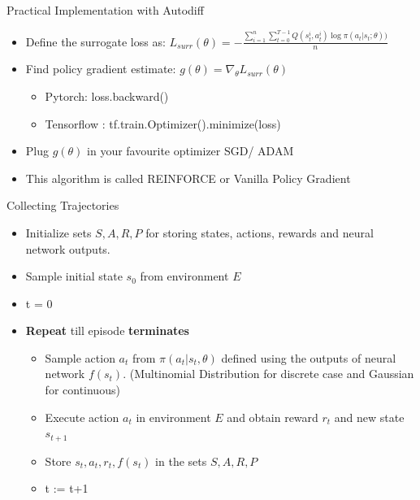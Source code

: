 \begin{frame}{Practical Implementation with Autodiff}
    \begin{itemize}
    \item Define the surrogate loss as:
    $L_{surr}(\theta) = -\frac{\sum_{i = 1}^n \sum_{t=0}^{T-1}Q(s_t^i,a_t^i)\log\pi(a_t|s_t;\theta))}{n}$
    \item Find policy gradient estimate: $g(\theta) = \nabla_{\theta}L_{surr}(\theta)$
    \begin{itemize}
        \item Pytorch: loss.backward()
        \item Tensorflow : tf.train.Optimizer().minimize(loss)
    \end{itemize}
    \item Plug $g(\theta)$ in your favourite optimizer SGD/ ADAM
    \item This algorithm is called REINFORCE or Vanilla Policy Gradient
\end{itemize}
\end{frame}
\begin{frame}{Collecting Trajectories}
    \begin{itemize}
        \item[] Initialize sets $S, A, R, P$ for storing states, actions, rewards and neural network outputs.
        \item[] Sample initial state $s_0$ from environment $E$
        \item[] t = 0
        \item[] \textbf{Repeat} till episode \textbf{terminates}
        \begin{itemize}
            \item[] Sample action $a_t$ from $\pi(a_t|s_t,\theta)$ defined using the outputs of neural network $f(s_t)$. (Multinomial Distribution for discrete case and Gaussian for continuous)
            \item[] Execute action $a_t$ in environment $E$ and obtain reward $r_t$ and new state $s_{t+1}$
            \item[] Store $s_t, a_t, r_t, f(s_t)$ in the sets $S, A, R, P$
            \item[] t := t+1
        \end{itemize}
    \end{itemize}
\end{frame}
